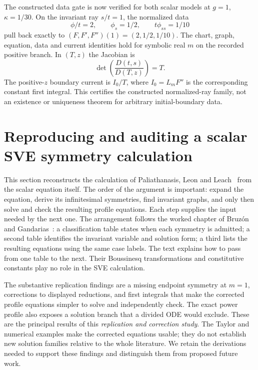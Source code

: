 \documentclass[11pt]{article}
\theoremstyle{definition}
\begin{document}
The constructed data gate is now verified for both scalar models at
$g=1$, $\kappa=1/30$. On the invariant ray $s/t=1$, the normalized data
\[
 \phi/t=2,\qquad \phi_s=1/2,\qquad t\phi_{ss}=1/10
\]
pull back exactly to $(F,F',F'')(1)=(2,1/2,1/10)$.
The chart, graph, equation, data and current identities hold for symbolic
real $m$ on the recorded positive branch. In $(T,z)$ the Jacobian is
\[
 \det\!\left(\frac{D(t,s)}{D(T,z)}\right)=T.
\]
The positive-$z$ boundary current is
$I_0/T$, where $I_0=L_mF''$ is the corresponding constant first integral.
This certifies the constructed normalized-ray family, not an existence or
uniqueness theorem for arbitrary initial-boundary data.


\clearpage
\section{Reproducing and auditing a scalar SVE symmetry calculation}
\label{sec:sve-repro}
This section reconstructs the calculation of Paliathanasis, Leon and
Leach~\cite{ap} from the scalar equation itself. The order of the argument is
important: expand the equation, derive its infinitesimal symmetries, find
invariant graphs, and only then solve and check the resulting profile
equations. Each step supplies the input needed by the next one. The
arrangement follows the worked chapter of Bruz\'{o}n and
Gandarias~\cite[Sec.~2, Tables~1--3, pp.~157--159]{bruzon-gandarias-2021}:
a classification table states when each symmetry is admitted; a second
table identifies the invariant variable and solution form; a third lists
the resulting equations using the same case labels. The text explains how
to pass from one table to the next. Their Boussinesq transformations and
constitutive constants play no role in the SVE calculation.

The substantive replication findings are a missing endpoint symmetry at
$m=1$, corrections to displayed reductions, and first integrals that make
the corrected profile equations simpler to solve and independently check.
The exact power profile also exposes a solution branch that a divided ODE
would exclude. These are the principal results of this
\emph{replication and correction study}. The Taylor and numerical examples
make the corrected equations usable; they do not establish new solution
families relative to the whole literature. We retain the derivations needed
to support these findings and distinguish them from proposed future work.
\end{document}

